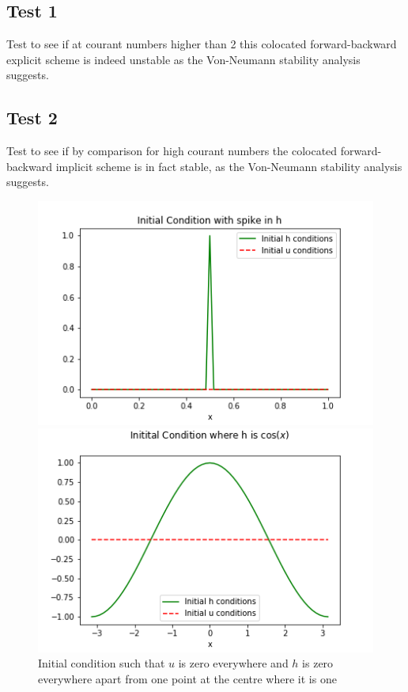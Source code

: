 \documentclass[a4paper,12pt, notitlepage]{report}
\begin{document}
\subsection*{Test 1}
Test to see if at courant numbers higher than 2 this colocated forward-backward explicit scheme is indeed unstable as the Von-Neumann stability analysis suggests.

\subsection* {Test 2}
Test to see if by comparison for high courant numbers the colocated forward-backward implicit scheme is in fact stable, as the Von-Neumann stability analysis suggests.


\begin{figure}
	\begin{minipage}{.5\textwidth}
		\ContinuedFloat*
		\centering
		\captionsetup{width=0.9\textwidth}
		\captionsetup{justification=centering}
		\includegraphics[width=\textwidth]{initial_condition_spike.png}
		\caption{\label{initialconditionspike}Initial condition such that $u$ is zero everywhere and $h$ is zero everywhere apart from one point at the centre where it is one} 
	\end{minipage}
	\begin{minipage}{.5\textwidth}
		\ContinuedFloat*
		\centering
		\captionsetup{width=0.9\textwidth}
		\captionsetup{justification=centering}
		\includegraphics[width=\textwidth]{initial_condition_cos.png}

\end{minipage}
\end{figure}
\end{document}
